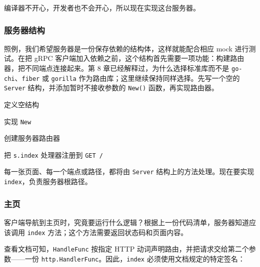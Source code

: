 编译器不开心，开发者也不会开心，所以现在实现这台服务器。

\subsubsection{服务器结构}

照例，我们希望服务器是一份保存依赖的结构体，这样就能配合相应 mock 进行测试。在把 gRPC 客户端加入依赖之前，这个结构首先需要一项功能：构建路由器，把不同端点连接起来。第 8 章已经解释过，为什么选择标准库而不是 \texttt{go-chi}、\texttt{fiber} 或 \texttt{gorilla} 作为路由库；这里继续保持同样选择。先写一个空的 \texttt{Server} 结构，并添加暂时不接收参数的 \texttt{New()} 函数，再实现路由器。


\begin{codeannotations}
\item 定义空结构
\item 实现 \texttt{New}
\item 创建服务器路由器
\item 把 \texttt{s.index} 处理器注册到 \texttt{GET /}
\end{codeannotations}

每一张页面、每一个端点或路径，都将由 \texttt{Server} 结构上的方法处理。现在要实现 \texttt{index}，负责服务器根路径。

\subsubsection{主页}

客户端导航到主页时，究竟要运行什么逻辑？根据上一份代码清单，服务器知道应该调用 \texttt{index} 方法；这个方法需要返回状态码和页面内容。

查看文档可知，\texttt{HandleFunc} 按指定 HTTP 动词声明路由，并把请求交给第二个参数——一份 \texttt{http.HandlerFunc}。因此，\texttt{index} 必须使用文档规定的特定签名：

